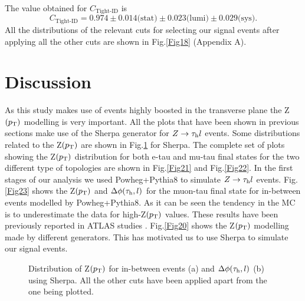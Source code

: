 The value obtained for $C_{\text{Tight-ID}}$ is
\begin{equation}
C_{\text{Tight-ID}}=0.974\pm 0.014\text{(stat)}\pm 0.023\text{(lumi)}\pm 0.029\text{(sys)}.
\end{equation}
All the distributions of the relevant cuts for selecting our signal events after applying all the other cuts are shown in Fig.\ref{Fig18} (Appendix A).
\section{Discussion}
As this study makes use of events highly boosted in the transverse plane the Z$(p_\text{T})$ modelling is very important. All the plots that have been shown in previous sections make use of the Sherpa generator for $Z\to\tau_\text{h} l$ events. Some distributions related to the Z$(p_\text{T})$ are shown in Fig.\ref{Fig19} for Sherpa. The complete set of plots showing the Z$(p_\text{T})$ distribution for both e-tau and mu-tau final states for the two different type of topologies are shown in Fig.\ref{Fig21} and Fig.\ref{Fig22}. In the first stages of our analysis we used Powheg+Pythia8 to simulate $Z\to\tau_\text{h} l$ events. Fig.\ref{Fig23} shows the Z$(p_\text{T})$ and $\Delta\phi(\tau_\text{h},l)$ for the muon-tau final state for in-between events modelled by Powheg+Pythia8. As it can be seen the tendency in the MC is to underestimate the data for high-Z$(p_\text{T})$ values. These results have been previously reported in ATLAS studies \cite{Aad:2019wmn}. Fig.\ref{Fig20} shows the Z$(p_\text{T})$ modelling made by different generators. This has motivated us to use Sherpa to simulate our signal events.
\begin{figure}[H]
	\centering
	\hfill
	\caption{Distribution of Z$(p_\text{T})$ for in-between events (a) and $\Delta\phi(\tau_\text{h},l)$ (b) using Sherpa. All the other cuts have been applied apart from the one being plotted.}
	\label{Fig19}
\end{figure}
